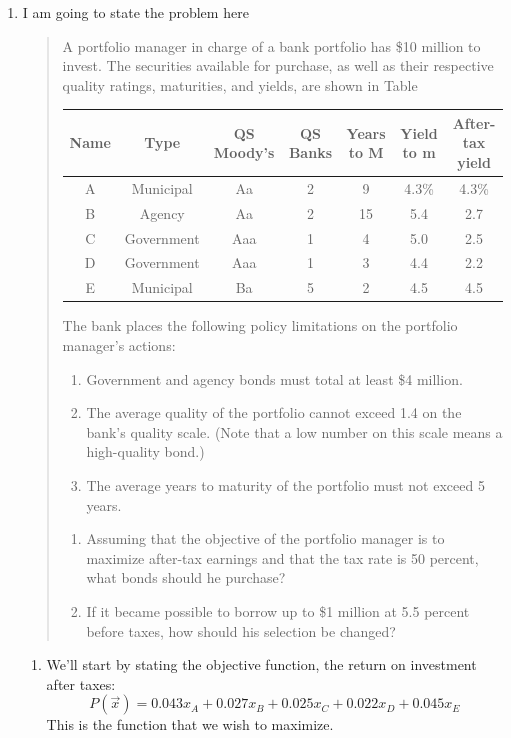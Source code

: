 \documentclass[11pt]{article}
\begin{document}
\begin{enumerate}
\item I am going to state the problem here
\begin{quote}
A portfolio manager in charge of a bank portfolio has \$10 million to invest. The
securities available for purchase, as well as their respective quality ratings, maturities, and yields, are shown
in Table

{\tiny
\begin{tabular}{c|c|c|c|c|c|c}
Name & Type & QS Moody's & QS Banks& Years to M & Yield to m& After-tax yield\\\hline
A& Municipal& Aa &2& 9& 4.3\% &4.3\%\\
B& Agency& Aa& 2& 15& 5.4& 2.7\\
C& Government& Aaa &1 &4 &5.0 &2.5\\
D &Government &Aaa& 1& 3& 4.4& 2.2\\
E& Municipal &Ba &5 &2 &4.5 &4.5
\end{tabular}}

The bank places the following policy limitations on the portfolio manager’s actions:
\begin{enumerate}
\item Government and agency bonds must total at least \$4 million.
\item  The average quality of the portfolio cannot exceed 1.4 on the bank’s quality scale. (Note that a low
number on this scale means a high-quality bond.)
\item  The average years to maturity of the portfolio must not exceed 5 years.
\end{enumerate}

\begin{enumerate}
\item Assuming that the objective of the portfolio manager is to maximize after-tax earnings and that the tax rate is 50 percent, what bonds should he purchase? 
\item If it became possible to borrow up to \$1 million at 5.5 percent before taxes, how should his selection be changed?
\end{enumerate}
\end{quote}

\begin{enumerate}
\item 
We'll start by stating the objective function, the return on investment after taxes:
\[
P(\vec x) = 0.043x_A + 0.027 x_B + 0.025 x_C + 0.022 x_D + 0.045 x_E
\]
This is the function that we wish to maximize.


\end{enumerate}
\end{enumerate}
\end{document}
